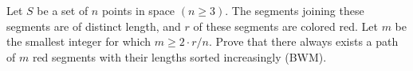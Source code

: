 Let $S$ be a set of $n$ points in space $(n \geq 3)$. The segments joining these segments are of distinct length, and $r$ of these segments are colored red. Let $m$ be the smallest integer for which $m \geq 2 \cdot r/n$. Prove that there always exists a path of $m$ red segments with their lengths sorted increasingly (BWM).
